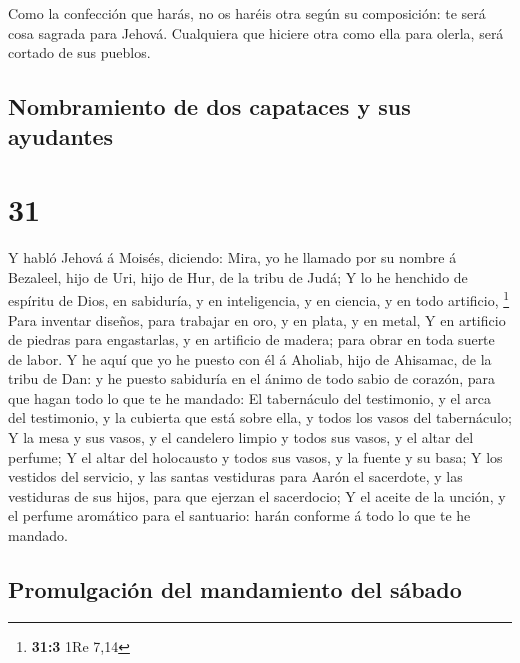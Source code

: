  Como la confección que harás, no os haréis otra según su
composición: te será cosa sagrada para Jehová.  Cualquiera
que hiciere otra como ella para olerla, será cortado de sus pueblos.

\hypertarget{nombramiento-de-dos-capataces-y-sus-ayudantes}{%
\subsection{Nombramiento de dos capataces y sus
ayudantes}\label{nombramiento-de-dos-capataces-y-sus-ayudantes}}

\hypertarget{section-30}{%
\section{31}\label{section-30}}

 Y habló Jehová á Moisés, diciendo:  Mira, yo he
llamado por su nombre á Bezaleel, hijo de Uri, hijo de Hur, de la tribu
de Judá;  Y lo he henchido de espíritu de Dios, en
sabiduría, y en inteligencia, y en ciencia, y en todo artificio,
\footnote{\textbf{31:3} 1Re 7,14}  Para inventar diseños,
para trabajar en oro, y en plata, y en metal,  Y en
artificio de piedras para engastarlas, y en artificio de madera; para
obrar en toda suerte de labor.  Y he aquí que yo he puesto
con él á Aholiab, hijo de Ahisamac, de la tribu de Dan: y he puesto
sabiduría en el ánimo de todo sabio de corazón, para que hagan todo lo
que te he mandado:  El tabernáculo del testimonio, y el arca
del testimonio, y la cubierta que está sobre ella, y todos los vasos del
tabernáculo;  Y la mesa y sus vasos, y el candelero limpio y
todos sus vasos, y el altar del perfume;  Y el altar del
holocausto y todos sus vasos, y la fuente y su basa;  Y los
vestidos del servicio, y las santas vestiduras para Aarón el sacerdote,
y las vestiduras de sus hijos, para que ejerzan el sacerdocio;
 Y el aceite de la unción, y el perfume aromático para el
santuario: harán conforme á todo lo que te he mandado.

\hypertarget{promulgaciuxf3n-del-mandamiento-del-suxe1bado}{%
\subsection{Promulgación del mandamiento del
sábado}\label{promulgaciuxf3n-del-mandamiento-del-suxe1bado}}

